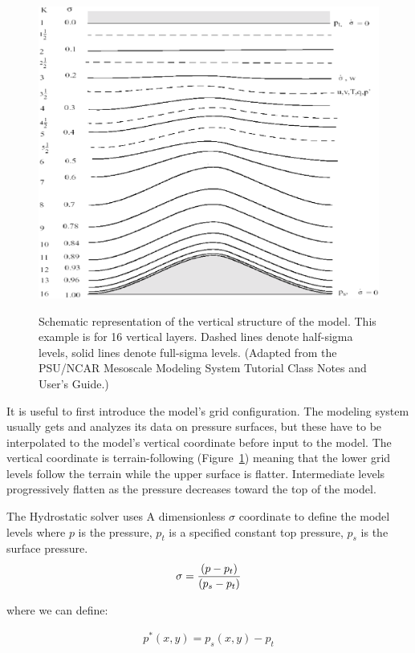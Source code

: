 \begin{figure}
\resizebox{6.45in}{!}
{\includegraphics{sigma_levels.eps}}
\caption{Schematic representation of the vertical structure of the model.
This example is for 16 vertical layers. Dashed lines denote half-sigma levels,
solid lines denote full-sigma levels. (Adapted from the PSU/NCAR Mesoscale
Modeling System Tutorial Class Notes and User's Guide.)}
\label{sigma_levels}
\end{figure}

It is useful to first introduce the model's grid configuration. The modeling
system usually gets and analyzes its data on pressure surfaces, but these have
to be interpolated to the model's vertical coordinate before input to the model.
The vertical coordinate is terrain-following (Figure~\ref{sigma_levels}) meaning
that the lower grid levels follow the terrain while the upper surface is
flatter. Intermediate levels progressively flatten as the pressure decreases
toward the top of the model. 

The Hydrostatic solver uses A dimensionless $\sigma$ coordinate to
define the model levels where $p$ is the pressure, $p_t$ is a specified
constant top pressure, $p_s$ is the surface pressure.
\begin{eqnarray}
  \sigma = {(p - p_t) \over (p_s - p_t)}
\end{eqnarray}

where we can define:

\begin{eqnarray}
  p^*(x,y) = p_s(x,y) - p_t
\end{eqnarray}


